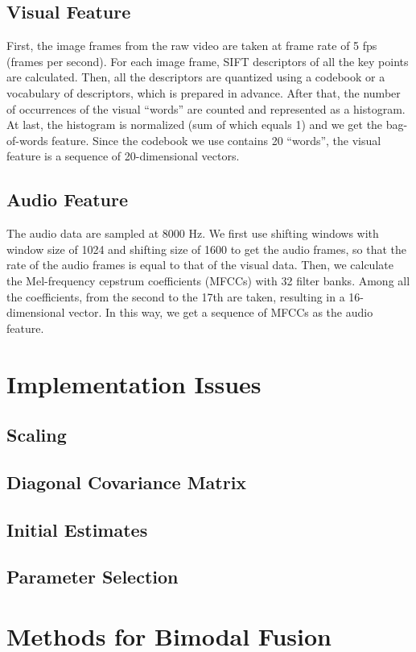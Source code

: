 \documentclass[12pt,final,twoside]{report}
\theoremstyle{plain}
\theoremstyle{definition}
\theoremstyle{remark}
\begin{document}
\subsection{Visual Feature}
First, the image frames from the raw video are taken at frame rate of 5 fps (frames per second). For each image frame, SIFT descriptors of all the key points are calculated. Then, all the descriptors are quantized using a codebook or a vocabulary of descriptors, which is prepared in advance. After that, the number of occurrences of the visual ``words'' are counted and represented as a histogram. At last, the histogram is normalized (sum of which equals 1) and we get the bag-of-words feature. Since the codebook we use contains 20 ``words'', the visual feature is a sequence of 20-dimensional vectors.

\subsection{Audio Feature}
The audio data are sampled at 8000 Hz. We first use shifting windows with window size of 1024 and shifting size of 1600 to get the audio frames, so that the rate of the audio frames is equal to that of the visual data. Then, we calculate the Mel-frequency cepstrum coefficients (MFCCs) with 32 filter banks. Among all the coefficients, from the second to the 17th are taken, resulting in a 16-dimensional vector. In this way, we get a sequence of MFCCs as the audio feature.


\section{Implementation Issues}
\subsection{Scaling}
\subsection{Diagonal Covariance Matrix}
\subsection{Initial Estimates}
\subsection{Parameter Selection}

\section{Methods for Bimodal Fusion}
\end{document}
